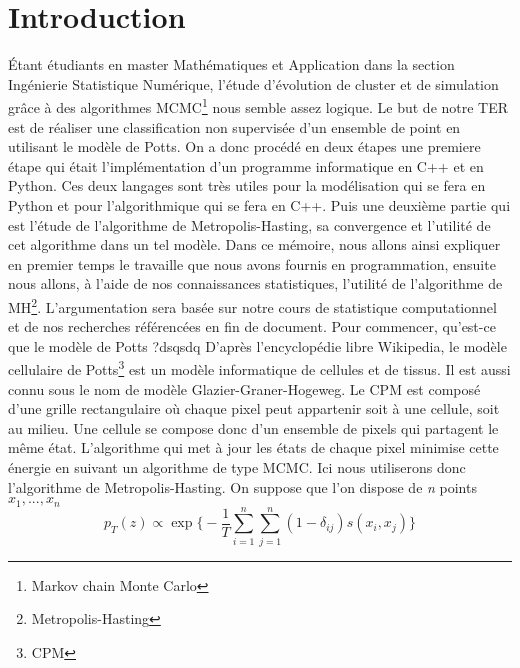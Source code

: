 \chapter{Introduction}
\setcounter{chapter}{1}
\newcommand\tab[1][0.8cm]{\hspace*{#1}}

\begin{article}
    Étant étudiants en master Mathématiques et Application dans la section Ingénierie Statistique Numérique, l'étude d'évolution de cluster et de simulation grâce à des algorithmes MCMC\footnote{Markov chain Monte Carlo} nous semble assez logique.
Le but de notre TER est de réaliser une classification non supervisée d'un ensemble de point en utilisant le modèle de Potts.
On a donc procédé en deux étapes une premiere étape qui était l'implémentation d'un programme informatique en C++ et en Python.
Ces deux langages sont très utiles pour la modélisation qui se fera en Python et pour l'algorithmique qui se fera en C++.
Puis une deuxième partie qui est l'étude de l'algorithme de Metropolis-Hasting, sa convergence et l'utilité de cet algorithme dans un tel modèle.
Dans ce mémoire, nous allons ainsi expliquer en premier temps le travaille que nous avons fournis en programmation, ensuite nous allons, à l'aide de nos connaissances statistiques, l'utilité de l'algorithme de MH\footnote{Metropolis-Hasting}.
    \newline L'argumentation sera basée sur notre cours de statistique computationnel et de nos recherches référencées en fin de document.
    \newline \newline
    \tab Pour commencer, qu'est-ce que le modèle de Potts ?dsqsdq
    \newline D'après l'encyclopédie libre Wikipedia, le modèle cellulaire de Potts\footnote{CPM} est un modèle informatique de cellules et de tissus.
    Il est aussi connu sous le nom de modèle Glazier-Graner-Hogeweg.
    Le CPM est composé d'une grille rectangulaire où chaque pixel peut appartenir soit à une cellule, soit au milieu.
    Une cellule se compose donc d'un ensemble de pixels qui partagent le même état.
    L'algorithme qui met à jour les états de chaque pixel minimise cette énergie en suivant un algorithme de type MCMC.
    Ici nous utiliserons donc l'algorithme de Metropolis-Hasting.
    \newline \tab On suppose que l’on dispose de \textit{n} points $x_{1},...,x_{n}$
    \newline \[p_{T}(z)\propto\exp\Bigg\{-\frac{1}{T}\sum_{i=1}^{n}\sum_{j=1}^{n}(1-\delta_{ij})s(x_i,x_j)\Bigg\}\]

\end{article}